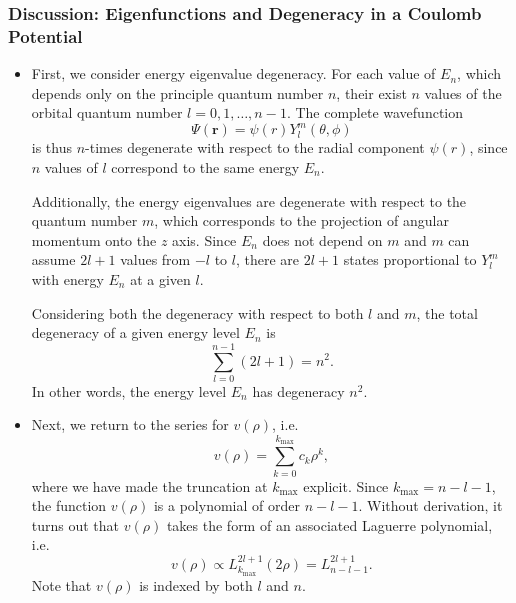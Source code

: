 \documentclass[11pt, a4paper]{article}
\renewcommand{\vec}[1]{\bm{#1}}  %
\renewcommand{\r}{\vec{r}}  %
\newcommand{\p}{\psi}  %
\renewcommand{\P}{\Psi}  %
\begin{document}
\subsubsection{Discussion: Eigenfunctions and Degeneracy in a Coulomb Potential}
\begin{itemize}
	\item First, we consider energy eigenvalue degeneracy. For each value of $ E_{n} $, which depends only on the principle quantum number $ n $, their exist $ n $ values of the orbital quantum number $ l = 0, 1, \ldots, n-1 $. The complete wavefunction 
	\begin{equation*}
		\P(\r) = \p(r)Y_{l}^{m}(\theta, \phi) 
	\end{equation*}
	is thus $ n $-times degenerate with respect to the radial component $ \p(r) $, since $ n $ values of $ l $ correspond to the same energy $ E_{n} $. 
	
	Additionally, the energy eigenvalues are degenerate with respect to the quantum number $ m $, which corresponds to the projection of angular momentum onto the $ z $ axis. Since $ E_{n} $ does not depend on $ m $ and $ m $ can assume $ 2l + 1 $ values from $ -l $ to $ l $, there are $ 2l + 1 $ states proportional to $ Y_{l}^{m} $ with energy $ E_{n} $ at a given $ l $.  
	
	Considering both the degeneracy with respect to both $ l $ and $ m $, the total degeneracy of a given energy level $ E_{n} $ is
	\begin{equation*}
		\sum_{l = 0}^{n-1}(2l+1) = n^{2}.
	\end{equation*}
	In other words, the energy level $ E_{n} $ has degeneracy $ n^{2} $. 
	
	\item Next, we return to the series for $ v(\rho) $, i.e.
	\begin{equation*}
		v(\rho) = \sum_{k = 0}^{k_{\text{max}}} c_{k}\rho^{k},
	\end{equation*}
	where we have made the truncation at $ k_{\text{max}} $ explicit. Since $ k_{\text{max}} = n - l - 1 $, the function $ v(\rho) $ is a polynomial of order $ n - l - 1 $. Without derivation, it turns out that $ v(\rho) $ takes the form of an associated Laguerre polynomial, i.e.
	\begin{equation*}
		v(\rho) \propto L_{k_{\text{max}}}^{2l+1}(2\rho) = L_{n - l - 1}^{2l + 1}.
	\end{equation*}
	Note that $ v(\rho) $ is indexed by both $ l $ and $ n $.
	

\end{itemize}
\end{document}

